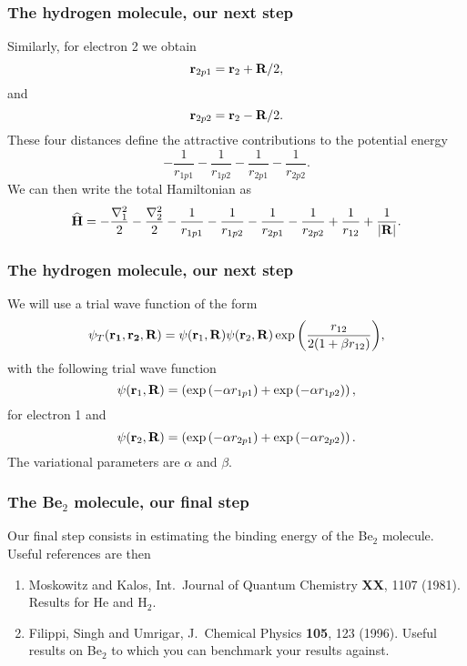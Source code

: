 \documentclass[compress]{beamer}
\newcommand{\OP}[1]{{\bf\widehat{#1}}}
\begin{document}
\frame
{
  \frametitle{The hydrogen molecule, our next step}
\begin{small}
{\scriptsize
Similarly, for electron 2 we obtain
\[
{\bf r}_{2p1}={\bf r}_2+{\bf R}/2,
\]
and
\[
{\bf r}_{2p2}={\bf r}_2-{\bf R}/2.
\]
These four distances define the attractive contributions to the potential energy
\[
   -\frac{1}{r_{1p1}}-\frac{1}{r_{1p2}}-\frac{1}{r_{2p1}}-\frac{1}{r_{2p2}}.
\]
We can then write the total Hamiltonian as 
\[
   \OP{H}=-\frac{\nabla_1^2}{2}-\frac{\nabla_2^2}{2}
   -\frac{1}{r_{1p1}}-\frac{1}{r_{1p2}}-\frac{1}{r_{2p1}}-\frac{1}{r_{2p2}}
               +\frac{1}{r_{12}}+\frac{1}{|{\bf R}|}.
\]
}
\end{small}
}
\frame
{
  \frametitle{The hydrogen molecule, our next step}
\begin{small}
{\scriptsize
We will use a trial wave function of the form
\[
   \psi_{T}({\bf r_1},{\bf r_2}, {\bf R}) =
   \psi({\bf r}_1,{\bf R})\psi({\bf r}_2,{\bf R})
   \exp{\left(\frac{r_{12}}{2(1+\beta r_{12})}\right)},
\]
with the following trial wave function 
\[
   \psi({\bf r}_1,{\bf R})=\left(\exp{(-\alpha r_{1p1})}
      +\exp{(-\alpha r_{1p2})}\right),
\]
for electron 1 and
\[
   \psi({\bf r}_2,{\bf R})=\left(\exp{(-\alpha r_{2p1})}
      +\exp{(-\alpha r_{2p2})}\right).
\]
The variational parameters are $\alpha$ and $\beta$.

}
\end{small}
}
\frame
{
  \frametitle{The Be$_2$ molecule, our final step}
\begin{small}
{\scriptsize
Our final step consists in estimating the binding energy of the Be$_2$ molecule.
Useful references are then
\begin{enumerate}
\item Moskowitz and Kalos, Int.~Journal of Quantum Chemistry {\bf XX}, 1107 (1981).
Results for He and H$_2$.
\item Filippi, Singh and Umrigar, J.~Chemical Physics {\bf 105}, 123 (1996).   Useful results on
Be$_2$ to which you can benchmark your results against.
\end{enumerate}
}
\end{small}
}
\end{document}
